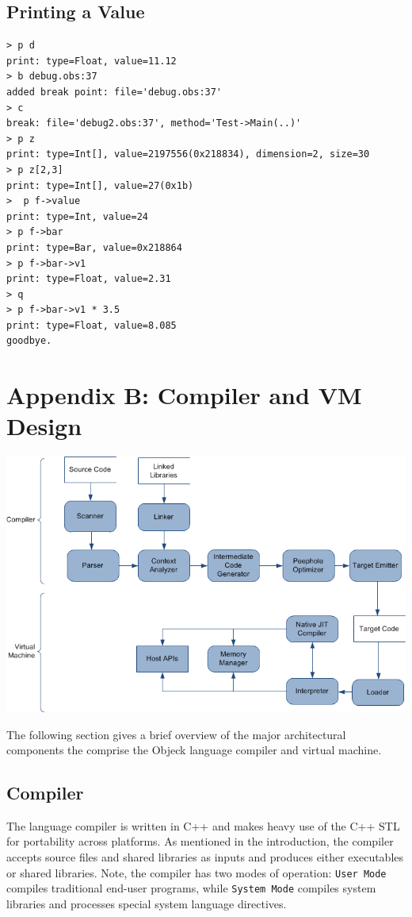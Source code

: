 \documentclass[12pt]{article}
\begin{document}
\subsection{Printing a Value}
\begin{verbatim}
> p d
print: type=Float, value=11.12
> b debug.obs:37
added break point: file='debug.obs:37'
> c
break: file='debug2.obs:37', method='Test->Main(..)'
> p z
print: type=Int[], value=2197556(0x218834), dimension=2, size=30
> p z[2,3]
print: type=Int[], value=27(0x1b)
>  p f->value
print: type=Int, value=24
> p f->bar
print: type=Bar, value=0x218864
> p f->bar->v1
print: type=Float, value=2.31
> q
> p f->bar->v1 * 3.5
print: type=Float, value=8.085
goodbye.
\end{verbatim}

\section{Appendix B: Compiler and VM Design}
\includegraphics[scale=0.60]{../../images/compiler_data_flow.png}

The following section gives a brief overview of the major
architectural components the comprise the Objeck language compiler and
virtual machine.

\subsection{Compiler}
The language compiler is written in C++ and makes heavy use of the C++
STL for portability across platforms.  As mentioned in the
introduction, the compiler accepts source files and shared libraries
as inputs and produces either executables or shared libraries.  Note,
the compiler has two modes of operation: \texttt{User Mode} compiles
traditional end-user programs, while \texttt{System Mode} compiles
system libraries and processes special system language directives.
\end{document}
